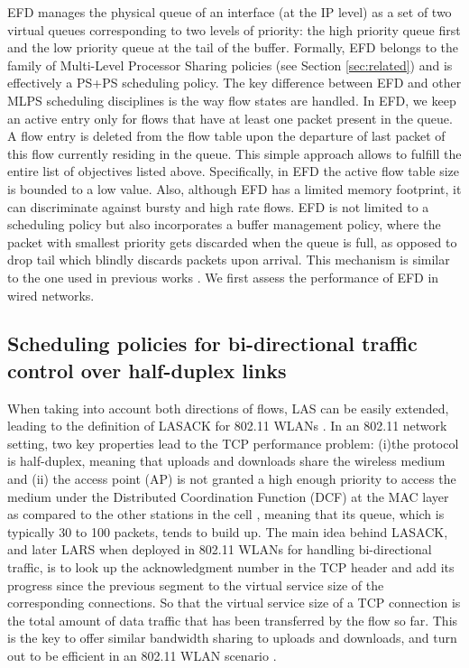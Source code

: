 \documentclass[preprint,12pt]{elsarticle}
\begin{document}
EFD manages the physical queue of an interface (at the IP level) as a set of two virtual queues corresponding to two levels of priority: the high priority queue first and the low priority queue at the tail of the buffer. Formally, EFD belongs to the family of Multi-Level Processor Sharing policies (see Section \ref{sec:related}) and is effectively a PS+PS scheduling policy. The key difference between EFD and other MLPS scheduling disciplines is the way flow states are handled. In EFD, we keep an active entry only for flows that have at least one packet present in the queue. A flow entry is deleted from the flow table upon the departure of last packet of this flow currently residing in the queue. This simple approach allows to fulfill the entire list of objectives listed above. Specifically, in EFD the active flow table size is bounded to a low value. Also, although EFD  has a limited memory footprint, it can discriminate against bursty and high rate flows. EFD is not limited to a scheduling policy but also incorporates a buffer management policy, where the packet with smallest priority gets discarded when the queue is full, as opposed to drop tail which blindly discards packets upon arrival. This mechanism is similar to the one used in previous works \cite{Rai04size-basedscheduling,DivakaranCAP10}. We first assess the performance of EFD in wired networks.

\subsection{Scheduling policies for bi-directional traffic control over half-duplex links}
When taking into account both directions of flows, LAS can be easily extended, leading to the definition of LASACK for 802.11 WLANs \cite{Keller2008Improving}. In an 802.11 network setting, two key properties lead to the TCP performance problem: (i)the protocol is half-duplex, meaning that uploads and downloads share the wireless medium and (ii) the access point (AP) is not granted a high enough priority to access the medium under the Distributed Coordination Function (DCF) at the MAC layer as compared to the other stations in the cell \cite{Pilosof03understandingtcp}, meaning that its queue, which is typically 30 to 100 packets, tends to build up. The main idea behind LASACK, and later LARS \cite{heusse2011least} when deployed in 802.11 WLANs for handling bi-directional traffic, is to look up the acknowledgment number in the TCP header and add its progress since the previous segment to the virtual service size of the corresponding connections. So that the virtual service size of a TCP connection is the total amount of data traffic that has been transferred by the flow so far. This is the key to offer similar bandwidth sharing to uploads and downloads, and turn out to be efficient in an 802.11 WLAN scenario \cite{Keller2008Improving,heusse2011least}. 
\end{document}
